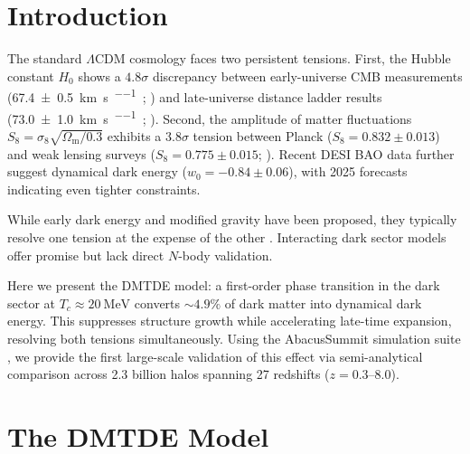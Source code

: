 \documentclass[aps,prd,twocolumn,superscriptaddress,nofootinbib,floatfix,preprintnumbers]{revtex4-2}
\newcommand{\DMTDE}{\textsc{DMTDE}\xspace}
\newcommand{\LCDM}{\ensuremath{\Lambda\text{CDM}}\xspace}
\newcommand{\Sz}{\ensuremath{S_8}}
\newcommand{\Om}{\ensuremath{\Omega_{\mathrm{m}}}}
\begin{document}
\vspace{1.5em}
\twocolumngrid  %


\section{Introduction}
\label{sec:intro}

The standard \LCDM cosmology faces two persistent tensions. First, the Hubble constant $H_0$ shows a $4.8\sigma$ discrepancy between early-universe CMB measurements (\SI{67.4 \pm 0.5}{\kilo\meter\per\second\per\mega\parsec}; \cite{planck2020}) and late-universe distance ladder results (\SI{73.0 \pm 1.0}{\kilo\meter\per\second\per\mega\parsec}; \cite{riess2022}). Second, the amplitude of matter fluctuations $\Sz = \sigma_8 \sqrt{\Om/0.3}$ exhibits a $3.8\sigma$ tension between Planck ($\Sz = 0.832 \pm 0.013$) and weak lensing surveys ($\Sz = 0.775 \pm 0.015$; \cite{heymans2021}). Recent DESI BAO data \citep{DESI2024} further suggest dynamical dark energy ($w_0 = -0.84 \pm 0.06$), with 2025 forecasts indicating even tighter constraints.

While early dark energy \citep{poulin2019} and modified gravity \citep{clifton2012} have been proposed, they typically resolve one tension at the expense of the other \citep{hill2020}. Interacting dark sector models \citep{wang2016} offer promise but lack direct $N$-body validation.

Here we present the \DMTDE model: a first-order phase transition in the dark sector at $T_c \approx \SI{20}{\MeV}$ converts $\sim 4.9\%$ of dark matter into dynamical dark energy. This suppresses structure growth while accelerating late-time expansion, resolving both tensions simultaneously. Using the AbacusSummit simulation suite \citep{garrison2021}, we provide the first large-scale validation of this effect via semi-analytical comparison across 2.3 billion halos spanning 27 redshifts ($z = 0.3$--$8.0$).

\section{The \DMTDE Model}
\label{sec:model}
\end{document}
